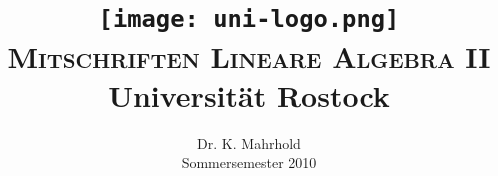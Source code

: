 \documentclass[%
a4paper,
10pt,           %
]
{scrartcl}
\newcommand{\R}{\mathbb{R}}
\theoremstyle{plain}
\newtheorem{mydef}{Definition}[section]
\theoremstyle{plain}
\newtheorem{mysatz}[mydef]{Satz}
\theoremstyle{plain}
\newtheorem{mylemma}[mydef]{Lemma}
\theoremstyle{plain}
\theoremstyle{plain}
\begin{document}
\title{
\texttt{[image: uni-logo.png]}\\
\textsc{Mitschriften Lineare Algebra II}
\\ Universität Rostock}

\author{Dr. K. Mahrhold\\ Sommersemester 2010}

\begin{titlepage}
\maketitle
\end{titlepage}

%
%
%
%
%
%
%
%
%
\end{document}

